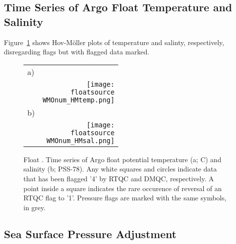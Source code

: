 \documentclass{article}
\begin{document}
\subsection{Time Series of Argo Float Temperature and Salinity}
%
Figure~\ref{hovmoller} shows Hov-M{\"o}ller plots of temperature and
salinty, respectively, disregarding flags but with flagged data marked.
\begin{figure}[H]
  \centering
  \begin{tabular}{lr}
  a) & \\
  &\texttt{[image: \\floatsource\\WMOnum\_HMtemp.png]}\\
  b)& \\
  &\texttt{[image: \\floatsource\\WMOnum\_HMsal.png]}
  \end{tabular}
  \caption{Float \WMOnum. Time series of Argo float potential temperature
    (a; \textdegree C) and salinity (b; PSS-78). Any white squares and
  circles indicate data that has been flagged '4' by RTQC and DMQC,
  respectively. A point inside a square indicates the rare occurence of
  reversal of an RTQC flag to '1'. Pressure flags are marked with the same
  symbols, in grey.}
\label{hovmoller}
\end{figure}


\newpage
\subsection{Sea Surface Pressure Adjustment}

\end{document}
